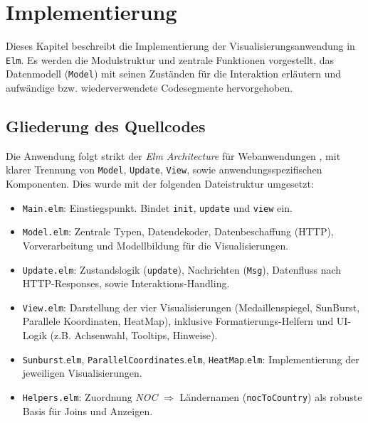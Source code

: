 \section{Implementierung}
Dieses Kapitel beschreibt die Implementierung der Visualisierungsanwendung in \texttt{Elm}. Es werden die Modulstruktur und zentrale Funktionen vorgestellt, das Datenmodell (\texttt{Model}) mit seinen Zuständen für die Interaktion erläutern und aufwändige bzw. wiederverwendete Codesegmente hervorgehoben.

\subsection{Gliederung des Quellcodes}
Die Anwendung folgt strikt der \emph{Elm Architecture} für Webanwendungen \cite{elm}, mit klarer Trennung von \texttt{Model}, \texttt{Update}, \texttt{View}, sowie anwendungsspezifischen Komponenten. Dies wurde mit der folgenden Dateistruktur umgesetzt:

\begin{itemize}
	\item \texttt{Main.elm}: Einstiegspunkt. Bindet \texttt{init}, \texttt{update} und \texttt{view} ein.
	\item \texttt{Model.elm}: Zentrale Typen, Datendekoder, Datenbeschaffung (HTTP), Vorverarbeitung und Modellbildung für die Visualisierungen. %
	\item \texttt{Update.elm}: Zustandslogik (\texttt{update}), Nachrichten (\texttt{Msg}), Datenfluss nach HTTP-Responses, sowie Interaktions-Handling.
	\item \texttt{View.elm}: Darstellung der vier Visualisierungen (Medaillenspiegel, SunBurst, Parallele Koordinaten, HeatMap), inklusive Formatierungs-Helfern und UI-Logik (z.B. Achsenwahl, Tooltips, Hinweise).
	\item \texttt{Sunburst}.\texttt{elm}, \texttt{ParallelCoordinates}.\texttt{elm}, \texttt{HeatMap}.\texttt{elm}: Implementierung der jeweiligen Visualisierungen.
	\item \texttt{Helpers.elm}: Zuordnung \emph{NOC} $\Rightarrow$ Ländernamen (\texttt{nocToCountry}) als robuste Basis für Joins und Anzeigen.
\end{itemize}

